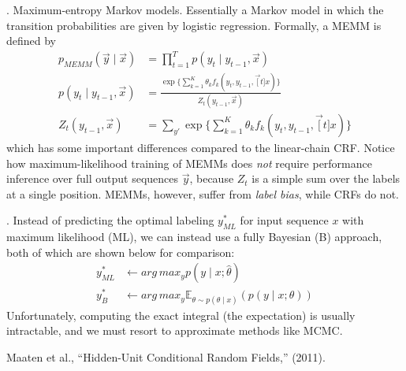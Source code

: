 \documentclass[11pt]{article}
\begin{document}
\myspace{}
\myspace

\p {}. Maximum-entropy Markov models. Essentially a Markov model in which the transition probabilities are given by logistic regression. Formally, a MEMM is defined by
\begin{align}
p_{MEMM}(\vec y \mid \vec x) &= \prod_{t = 1}^{T} p(y_t \mid y_{t -1}, \vec x) \\
p(y_t \mid y_{t-1}, \vec x) &= \frac{ \exp\bigg\{  \sum_{k=1}^{K} \theta_k f_k(y_t, y_{t-1}, \vec[t]{x}) \bigg\} }{ Z_t(y_{t-1}, \vec x) } \\
Z_t(y_{t-1}, \vec x) &= \sum_{y'} \exp\bigg\{  \sum_{k=1}^{K} \theta_k f_k(y_t, y_{t-1}, \vec[t]{x}) \bigg\}
\end{align}
which has some important differences compared to the linear-chain CRF. Notice how maximum-likelihood training of MEMMs does \textit{not} require performance inference over full output sequences $\vec y$, because $Z_t$ is a simple sum over the labels at a single position. MEMMs, however, suffer from \textit{label bias}, while CRFs do not.

\myspace
\p {}. Instead of predicting the optimal labeling $y_{ML}^*$ for input sequence $x$ with maximum likelihood (ML), we can instead use a fully Bayesian (B) approach, both of which are shown below for comparison:
\begin{align}
y_{ML}^* &\leftarrow arg\,max_y p(y \mid x; \hat{\theta}) \\
y_{B}^* &\leftarrow arg\,max_y \mathbb{E}_{\theta \sim p(\theta \mid x)}(p(y \mid x; \theta))
\end{align}
Unfortunately, computing the exact integral (the expectation) is usually intractable, and we must resort to approximate methods like MCMC.  







\vspace{-1em}
{\footnotesize Maaten et al., ``Hidden-Unit Conditional Random Fields,'' (2011).}
\end{document}

